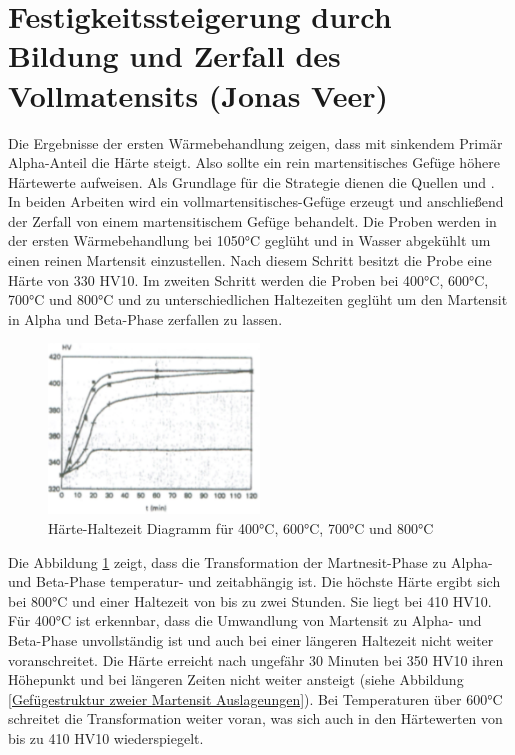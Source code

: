\documentclass[a4paper, 11pt]{tubsreprt}
\begin{document}
\section{Festigkeitssteigerung durch Bildung und Zerfall des Vollmatensits (Jonas Veer)}\label{Kapitel Bildung und Zerfall des Vollmartensits}
Die Ergebnisse der ersten Wärmebehandlung zeigen, dass mit sinkendem Primär Alpha-Anteil die Härte steigt. Also sollte ein rein martensitisches Gefüge höhere Härtewerte aufweisen. 
Als Grundlage für die Strategie dienen die Quellen \cite{Mur1995} und \cite{Tarin1995}. In beiden Arbeiten wird ein vollmartensitisches-Gefüge erzeugt und anschließend der Zerfall von einem martensitischem Gefüge behandelt. Die Proben werden in der ersten Wärmebehandlung bei 1050°C geglüht und in Wasser abgekühlt um einen reinen Martensit einzustellen. Nach diesem Schritt besitzt die Probe eine Härte von 330 HV10. Im zweiten Schritt werden die Proben bei 400°C, 600°C, 700°C und 800°C und zu unterschiedlichen Haltezeiten geglüht um den Martensit in Alpha und Beta-Phase zerfallen zu lassen. 

\begin{figure}
\centering
\includegraphics[width=0.5\textwidth]{Bilder/HaerteHaltezeitdiagramm.png}
\caption[Härte-Haltezeit Diagramm]{Härte-Haltezeit Diagramm für 400°C, 600°C, 700°C und 800°C \cite{Mur1995}}
\label{Härtehaltezeitdigramm}
\end{figure}

Die Abbildung \ref{Härtehaltezeitdigramm} zeigt, dass die Transformation der Martnesit-Phase zu Alpha- und Beta-Phase temperatur- und zeitabhängig ist. Die höchste Härte ergibt sich bei 800°C und einer Haltezeit von bis zu zwei Stunden. Sie liegt bei 410 HV10. Für 400°C ist erkennbar, dass die Umwandlung von Martensit zu Alpha- und Beta-Phase unvollständig ist und auch bei einer längeren Haltezeit nicht weiter voranschreitet. Die Härte erreicht nach ungefähr 30 Minuten bei 350 HV10 ihren Höhepunkt und bei längeren Zeiten nicht weiter ansteigt (siehe Abbildung \ref{Gefügestruktur zweier Martensit Auslageungen}). Bei Temperaturen über 600°C schreitet die Transformation weiter voran, was sich auch in den Härtewerten von bis zu 410 HV10 wiederspiegelt. 
\end{document}
